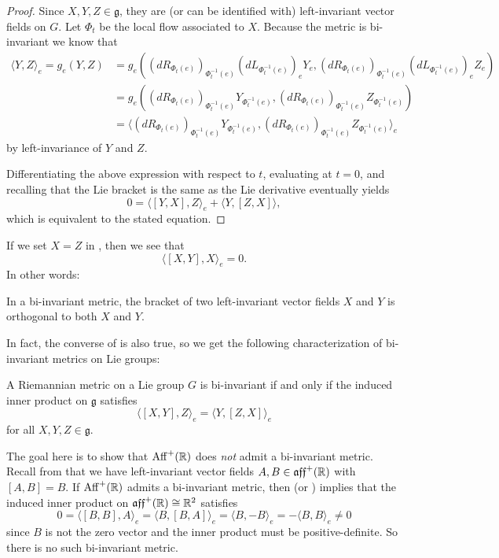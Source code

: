 \begin{proof}
	Since $X,Y,Z \in \mathfrak{g}$, they are (or can be identified with) left-invariant vector fields on $G$. Let $\Phi_t$ be the local flow associated to $X$. Because the metric is bi-invariant we know that
	\begin{align*}
		\langle Y, Z \rangle_e = g_e(Y,Z) & = g_e \left( (dR_{\Phi_t(e)})_{\Phi_t^{-1}(e)}(dL_{\Phi_t^{-1}(e)} )_e Y_e, (dR_{\Phi_t(e)})_{\Phi_t^{-1}(e)}(dL_{\Phi_t^{-1}(e) })_e Z_e\right) \\
		& = g_e \left( (dR_{\Phi_t(e)})_{\Phi_t^{-1}(e)} Y_{\Phi_t^{-1}(e)}, (dR_{\Phi_t(e)})_{\Phi_t^{-1}(e)} Z_{\Phi_t^{-1}(e)}\right) \\
		& = \langle (dR_{\Phi_t(e)})_{\Phi_t^{-1}(e)} Y_{\Phi_t^{-1}(e)}, (dR_{\Phi_t(e)})_{\Phi_t^{-1}(e)} Z_{\Phi_t^{-1}(e)} \rangle_e
	\end{align*}
	by left-invariance of $Y$ and $Z$. 
	
	Differentiating the above expression with respect to $t$, evaluating at $t=0$, and recalling that the Lie bracket is the same as the Lie derivative eventually yields
	\[
		0 = \langle [Y,X],Z \rangle_e + \langle Y, [Z,X] \rangle,
	\]
	which is equivalent to the stated equation.
\end{proof}

If we set $X=Z$ in , then we see that
\[
	\langle [X,Y],X \rangle_e = 0.
\]
In other words:
\begin{corollary}\label{cor:bracket orthogonal}
	In a bi-invariant metric, the bracket of two left-invariant vector fields $X$ and $Y$ is orthogonal to both $X$ and $Y$. 
\end{corollary}

In fact, the converse of  is also true, so we get the following characterization of bi-invariant metrics on Lie groups:

\begin{theorem}\label{thm:bi-invariant metric condition}
	A Riemannian metric on a Lie group $G$ is bi-invariant if and only if the induced inner product on $\mathfrak{g}$ satisfies
	\[
		\langle [X,Y],Z\rangle_e = \langle Y, [Z,X]\rangle_e
	\]
	for all $X,Y,Z \in \mathfrak{g}$.
\end{theorem}


\begin{example}\label{ex:no bi-invariant metric on aff}
	The goal here is to show that $\operatorname{Aff}^+(\mathbb{R})$ does \emph{not} admit a bi-invariant metric. Recall from  that we have left-invariant vector fields $A,B \in \mathfrak{aff}^+(\mathbb{R})$ with $[A,B]=B$. If $\operatorname{Aff}^+(\mathbb{R})$ admits a bi-invariant metric, then  (or ) implies that the induced inner product on $\mathfrak{aff}^+(\mathbb{R}) \cong \mathbb{R}^2$ satisfies
	\[
		0 = \langle [B,B],A \rangle_e = \langle B, [B,A] \rangle_e = \langle B, -B\rangle_e = -\langle B,B\rangle_e \neq 0
	\]
	since $B$ is not the zero vector and the inner product must be positive-definite. So there is no such bi-invariant metric.
\end{example}

